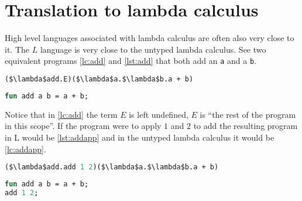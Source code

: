 \documentclass[11pt,oneside,a4paper]{report}
\begin{document}
\section{Translation to lambda calculus}
High level languages associated with lambda calculus are often also very close to it.
The $L$ language is very close to the untyped lambda calculus.
See two equivalent programs \autoref{lc:add} and \autoref{lst:add} that both add an \texttt{a} and a \texttt{b}.
\begin{lstlisting}[float,language=ML,caption={Add function in lambda calculus},label={lc:add},mathescape=true]
($\lambda$add.E)($\lambda$a.$\lambda$b.a + b)
\end{lstlisting}
\begin{lstlisting}[float,language=ML,caption={Add function in L},label={lst:add}]
fun add a b = a + b;
\end{lstlisting}
Notice that in \autoref{lc:add} the term $E$ is left undefined, $E$ is ``the rest of the program in this scope''.
If the program were to apply $1$ and $2$ to add the resulting program in L would be \autoref{lst:addapp} and in the untyped lambda calculus it would be \autoref{lc:addapp}.
\begin{lstlisting}[float,language=ML,caption={Add function in lambda calculus},label={lc:addapp},mathescape=true]
($\lambda$add.add 1 2)($\lambda$a.$\lambda$b.a + b)
\end{lstlisting}
\begin{lstlisting}[float,language=ML,caption={Add function applied},label={lst:addapp}]
fun add a b = a + b;
add 1 2;
\end{lstlisting}
\end{document}

